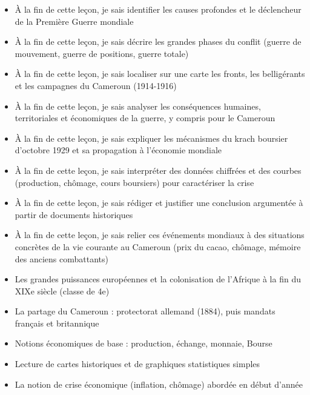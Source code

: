 \documentclass[11pt]{article}
\begin{document}
\begin{objectifs}
\begin{itemize}
\item À la fin de cette leçon, je sais identifier les causes profondes et le déclencheur de la Première Guerre mondiale
\item À la fin de cette leçon, je sais décrire les grandes phases du conflit (guerre de mouvement, guerre de positions, guerre totale)
\item À la fin de cette leçon, je sais localiser sur une carte les fronts, les belligérants et les campagnes du Cameroun (1914-1916)
\item À la fin de cette leçon, je sais analyser les conséquences humaines, territoriales et économiques de la guerre, y compris pour le Cameroun
\item À la fin de cette leçon, je sais expliquer les mécanismes du krach boursier d'octobre 1929 et sa propagation à l'économie mondiale
\item À la fin de cette leçon, je sais interpréter des données chiffrées et des courbes (production, chômage, cours boursiers) pour caractériser la crise
\item À la fin de cette leçon, je sais rédiger et justifier une conclusion argumentée à partir de documents historiques
\item À la fin de cette leçon, je sais relier ces événements mondiaux à des situations concrètes de la vie courante au Cameroun (prix du cacao, chômage, mémoire des anciens combattants)
\end{itemize}
\end{objectifs}

\begin{prerequis}
\begin{itemize}
\item Les grandes puissances européennes et la colonisation de l'Afrique à la fin du XIXe siècle (classe de 4e)
\item La partage du Cameroun : protectorat allemand (1884), puis mandats français et britannique
\item Notions économiques de base : production, échange, monnaie, Bourse
\item Lecture de cartes historiques et de graphiques statistiques simples
\item La notion de crise économique (inflation, chômage) abordée en début d'année
\end{itemize}
\end{prerequis}
\end{document}
